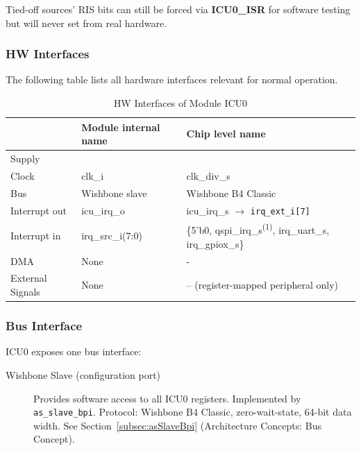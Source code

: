 Tied-off sources' RIS bits can
still be forced via \textbf{ICU0\_ISR} for software testing but will never
set from real hardware.

\subsubsection{HW Interfaces}
The following table lists all hardware interfaces relevant for normal operation.

\begin{table}[H]
\caption{HW Interfaces of Module ICU0}
\label{tab:asIcuPer02}
\centering
\begin{tabularx}{\textwidth}{|l |l |X|}
  \hline
   & Module internal name & Chip level name \\
  \hline
  \hline
  Supply &  &  \\
  \hline
  Clock & clk\_i & clk\_div\_s \\
  \hline
  Bus & Wishbone slave & Wishbone B4 Classic \\
  \hline
  Interrupt out & icu\_irq\_o & icu\_irq\_s $\to$ \texttt{irq\_ext\_i[7]} \\
  \hline
  Interrupt in & irq\_src\_i(7:0) & \{5'b0, qspi\_irq\_s\textsuperscript{(1)},
    irq\_uart\_s, irq\_gpiox\_s\} \\
  \hline
  DMA & None & - \\
  \hline
  External Signals & None & -- (register-mapped peripheral only) \\
  \hline
\end{tabularx}
\end{table}

\subsubsection{Bus Interface}
ICU0 exposes one bus interface:

\begin{description}
  \item[Wishbone Slave (configuration port)] Provides software access to
    all ICU0 registers. Implemented by \texttt{as\_slave\_bpi}.
    Protocol: Wishbone B4 Classic, zero-wait-state, 64-bit data width.
    See Section~\ref{subsec:asSlaveBpi} (Architecture Concepts: Bus Concept).
\end{description}

